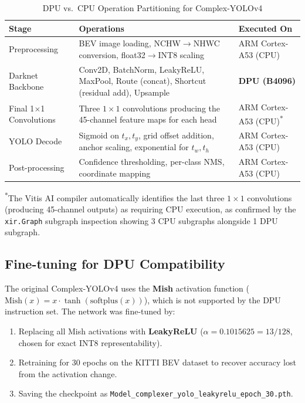 \documentclass[12pt, a4paper]{report}
\begin{document}
\begin{table}[H]
\centering
\caption{DPU vs.\ CPU Operation Partitioning for Complex-YOLOv4}
\label{tab:cyolo_partition}
\begin{tabular}{@{}p{3.5cm} p{5.5cm} p{4.5cm}@{}}
\toprule
\textbf{Stage} & \textbf{Operations} & \textbf{Executed On} \\
\midrule
Preprocessing & BEV image loading, NCHW$\to$NHWC conversion, float32$\to$INT8 scaling & ARM Cortex-A53 (CPU) \\
\midrule
Darknet Backbone & Conv2D, BatchNorm, LeakyReLU, MaxPool, Route (concat), Shortcut (residual add), Upsample & \textbf{DPU (B4096)} \\
\midrule
Final 1$\times$1 Convolutions & Three $1\times1$ convolutions producing the 45-channel feature maps for each head & ARM Cortex-A53 (CPU)\textsuperscript{*} \\
\midrule
YOLO Decode & Sigmoid on $t_x, t_y$, grid offset addition, anchor scaling, exponential for $t_w, t_h$ & ARM Cortex-A53 (CPU) \\
\midrule
Post-processing & Confidence thresholding, per-class NMS, coordinate mapping & ARM Cortex-A53 (CPU) \\
\bottomrule
\end{tabular}
\begin{flushleft}
\small \textsuperscript{*}The Vitis AI compiler automatically identifies the last three $1\times1$ convolutions (producing 45-channel outputs) as requiring CPU execution, as confirmed by the \texttt{xir.Graph} subgraph inspection showing 3 CPU subgraphs alongside 1 DPU subgraph.
\end{flushleft}
\end{table}

\subsection{Fine-tuning for DPU Compatibility}

The original Complex-YOLOv4 uses the \textbf{Mish} activation function ($\text{Mish}(x) = x \cdot \tanh(\text{softplus}(x))$), which is not supported by the DPU instruction set. The network was fine-tuned by:

\begin{enumerate}[nosep]
    \item Replacing all Mish activations with \textbf{LeakyReLU} ($\alpha = 0.1015625 = 13/128$, chosen for exact INT8 representability).
    \item Retraining for 30 epochs on the KITTI BEV dataset to recover accuracy lost from the activation change.
    \item Saving the checkpoint as \texttt{Model\_complexer\_yolo\_leakyrelu\_epoch\_30.pth}.
\end{enumerate}
\end{document}
